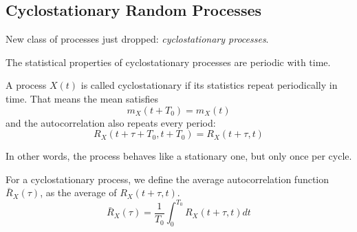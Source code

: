 \subsection{Cyclostationary Random Processes}
New class of processes just dropped: \textit{cyclostationary processes}.

\begin{idea}
	The statistical properties of cyclostationary processes are periodic with time.
\end{idea}

A process \(X(t)\) is called cyclostationary if its statistics repeat periodically in time.
That means the mean satisfies
\[
	m_X(t+T_0)=m_X(t)
\]
and the autocorrelation also repeats every period:
\[
	R_X(t+\tau+T_0,t+T_0)=R_X(t+\tau,t)
\]

In other words, the process behaves like a stationary one, but only once per cycle.

For a cyclostationary process, we define the average
autocorrelation function \(\bar{R}_X(\tau)\), as the average of \(R_X(t+\tau,t)\).
\[
	\bar{R}_X(\tau)=\frac{1}{T_0}\int_0^{T_0}R_X(t+\tau,t)dt
\]
